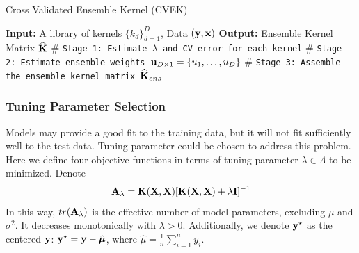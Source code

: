 \documentclass[11pt]{article}
\begin{document}

\begin{algorithm}
\caption{Cross Validated Ensemble Kernel (CVEK)} 
\label{alg:cvke}
\begin{algorithmic}[1]
\newline
\textbf{Input:} A library of kernels $\{k_d\}_{d=1}^D$, Data $({\bf y}, {\bf x})$\newline
\textbf{Output:} Ensemble Kernel Matrix $\widehat{{\bf K}}$\newline
$\#$ \texttt{Stage 1: Estimate $\lambda$ and CV error for each kernel}
\EndFor 
\newline
$\#$ \texttt{Stage 2: Estimate ensemble weights ${\bf u}_{D \times 1} = \{u_1, \dots, u_D\}$}
\newline
$\#$ \texttt{Stage 3: Assemble the ensemble kernel matrix $\widehat{{\bf K}}_{ens}$}
\EndProcedure
\end{algorithmic}
\end{algorithm}

\subsubsection{{Tuning Parameter Selection}}
Models may provide a good fit to the training data, but it will not fit sufficiently well to the test data. Tuning parameter could be chosen to address this problem. Here we define four objective functions in terms of tuning parameter $\lambda \in \Lambda$ to be minimized. Denote
\begin{align}
{\bf A}_\lambda={\bf K}({\bf X}, {\bf X})[{\bf K}({\bf X}, {\bf X})+\lambda {\bf I}]^{-1}
\end{align}
In this way, $tr({\bf A}_\lambda)$ is the effective number of model parameters, excluding $\mu$ and $\sigma^2$. It decreases monotonically with $\lambda>0$. Additionally, we denote ${\bf y}^\star$ as the centered ${\bf y}$: ${\bf y}^\star={\bf y}-\hat{\boldsymbol{\mu}}$, where $\hat{\mu}=\frac{1}{n}\sum_{i=1}^ny_i$.
\end{document}
